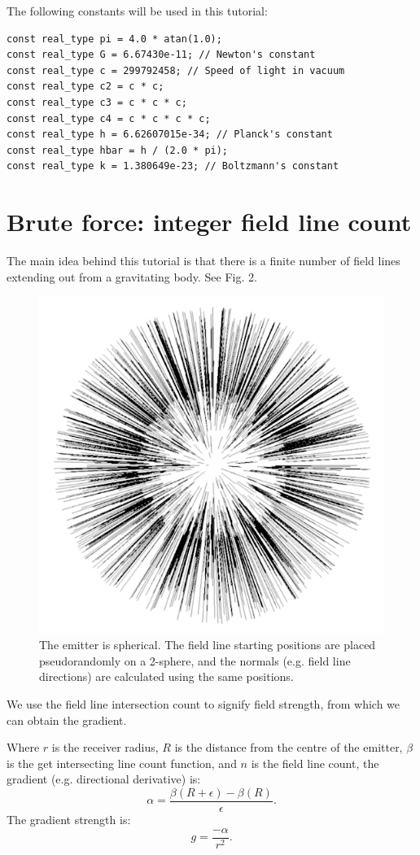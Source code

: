 \documentclass[12pt]{article}
\begin{document}
The following constants will be used in this tutorial:
\begin{lstlisting}
const real_type pi = 4.0 * atan(1.0);
const real_type G = 6.67430e-11; // Newton's constant
const real_type c = 299792458; // Speed of light in vacuum
const real_type c2 = c * c;
const real_type c3 = c * c * c;
const real_type c4 = c * c * c * c;
const real_type h = 6.62607015e-34; // Planck's constant
const real_type hbar = h / (2.0 * pi);
const real_type k = 1.380649e-23; // Boltzmann's constant
\end{lstlisting}



\section{Brute force: integer field line count}

The main idea behind this tutorial is that there is a finite number of field lines extending out from a gravitating body.
See Fig. 2.
\begin{figure} 
\centering
  \includegraphics[width = 3 in]{3.png}
  \caption{
The emitter is spherical.
The field line starting positions are placed pseudorandomly on a 2-sphere, and the normals (e.g. field line directions) are calculated using the same positions.
}
\end{figure}

We use the field line intersection count to signify field strength, from which we can obtain the gradient.

Where $r$ is the receiver radius, $R$ is the distance from the centre of the emitter, $\beta$ is the get intersecting line count function, and $n$ is the field line count, the gradient (e.g. directional derivative) is:
\begin{equation}
\alpha = \frac{\beta(R + \epsilon) - \beta(R)}{\epsilon}.
\end{equation}
The gradient strength is:
\begin{equation}
g = \frac{-\alpha}{r^2}.
\end{equation}
\end{document}
